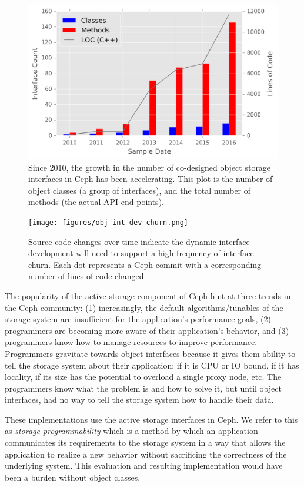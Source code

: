 \documentclass[10pt,twocolumn]{article}
\begin{document}
\begin{figure}[htbp]
\centering
\includegraphics{figures/obj-int-dev-growth.png}
\caption{Since 2010, the growth in the number of co-designed object
storage interfaces in Ceph has been accelerating. This plot is the
number of object classes (a group of interfaces), and the total number
of methods (the actual API end-points).\label{fig:obj-int-dev-growth}}
\end{figure}

\begin{figure}[htbp]
\centering
\texttt{[image: figures/obj-int-dev-churn.png]}
\caption{Source code changes over time indicate the dynamic interface
development will need to support a high frequency of interface churn.
Each dot represents a Ceph commit with a corresponding number of lines
of code changed. \label{fig:obj-int-dev-churn}}
\end{figure}

The popularity of the active storage component of Ceph hint at three
trends in the Ceph community: (1) increasingly, the default
algorithms/tunables of the storage system are insufficient for the
application's performance goals, (2) programmers are becoming more aware
of their application's behavior, and (3) programmers know how to manage
resources to improve performance. Programmers gravitate towards object
interfaces because it gives them ability to tell the storage system
about their application: if it is CPU or IO bound, if it has locality,
if its size has the potential to overload a single proxy node, etc. The
programmers know what the problem is and how to solve it, but until
object interfaces, had no way to tell the storage system how to handle
their data.

These implementations use the active storage interfaces in Ceph. We
refer to this as \emph{storage programmability} which is a method by
which an application communicates its requirements to the storage system
in a way that allows the application to realize a new behavior without
sacrificing the correctness of the underlying system. This evaluation
and resulting implementation would have been a burden without object
classes.
\end{document}

